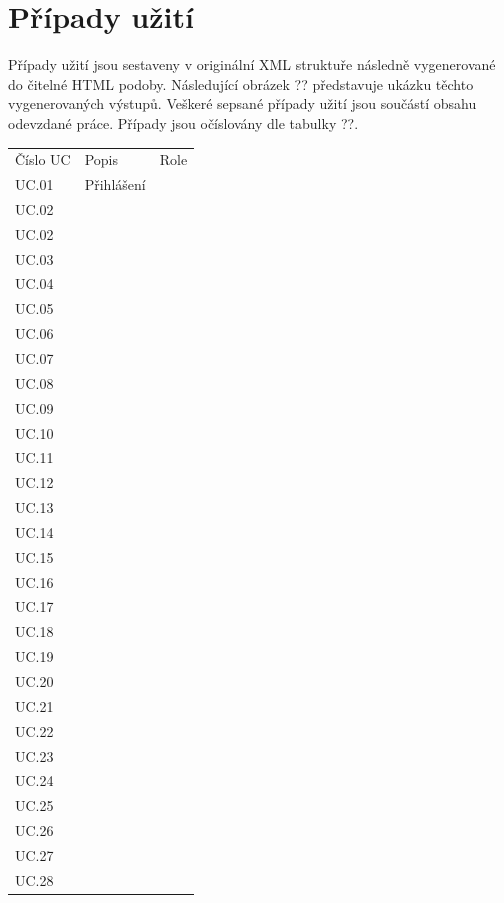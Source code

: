 \documentclass[czech,BP]{thesiskiv}
\begin{document}
{\raggedright\small


\appendix
\chapter{Případy užití}
Případy užití jsou sestaveny v originální XML struktuře následně vygenerované do čitelné HTML podoby. Následující obrázek ?? představuje ukázku těchto vygenerovaných výstupů. Veškeré sepsané případy užití jsou součástí obsahu odevzdané práce. Případy jsou očíslovány dle tabulky ??.

\begin{table}[]
	\centering
	\begin{tabular}{lll}
		Číslo UC & Popis & Role\\
		UC.01	& Přihlášení	&    \\
		UC.02	&       &    \\
		UC.02	&       &   \\
		UC.03	&       &    \\
		UC.04	&       &    \\
		UC.05	&       &    \\
		UC.06	&       &    \\
		UC.07	&       &    \\
		UC.08	&       &    \\
		UC.09	&       &    \\
		UC.10	&       &    \\
		UC.11	&       &    \\
		UC.12	&       &    \\
		UC.13	&       &    \\
		UC.14	&       &    \\
		UC.15	&       &    \\
		UC.16	&       &    \\
		UC.17	&       &    \\
		UC.18	&       &    \\
		UC.19	&       &    \\
		UC.20	&       &    \\
		UC.21	&       &    \\
		UC.22	&       &    \\
		UC.23	&       &    \\
		UC.24	&       &    \\
		UC.25	&       &    \\
		UC.26	&       &    \\
		UC.27	&       &    \\
		UC.28	&       &    \\

\end{tabular}
\end{table}}
\end{document}

